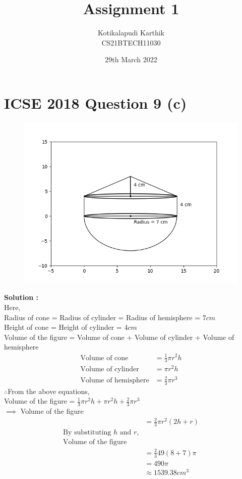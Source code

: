 \documentclass[journal,12pt,twocolumn]{IEEEtran}
\title{Assignment 1}
\author{Kotikalapudi Karthik \\
CS21BTECH11030}
\date{29th March 2022}
\begin{document}
\maketitle

\section*{ICSE 2018 Question 9 (c)}
\begin{figure}[ht!]
	  \centering 
	  \includegraphics[width=\columnwidth]{Figs/question9c.png}
\end{figure}
\textbf{Solution :}\\
Here,\\
Radius of cone = Radius of cylinder = Radius of hemisphere = $7cm$\\
Height of cone = Height of cylinder = $4cm$\\
Volume of the figure = Volume of cone + Volume of cylinder + Volume of hemisphere
\begin{align}
    \text{Volume of cone} &= \frac{1}{3} \pi r^2 h
    \\
    \text{Volume of cylinder} &= \pi r^2 h
    \\
    \text{Volume of hemisphere} &= \frac{2}{3} \pi r^3
\end{align}
$\therefore$From the above equations,\\
Volume of the figure = $\frac{1}{3} \pi r^2 h + \pi r^2 h + \frac{2}{3} \pi r^3$\\
$\implies$ Volume of the figure
\begin{align*}
    &= \frac{2}{3} \pi r^2 (2h+r)\\
    \text{By substituting $h$ and $r$,}\\
    \text{Volume of the figure}\\
    &= \frac{2}{3} 49 (8+7) \pi\\
    &= 490 \pi\\ 
    &\approx 1539.38cm^3
\end{align*}
\end{document}
